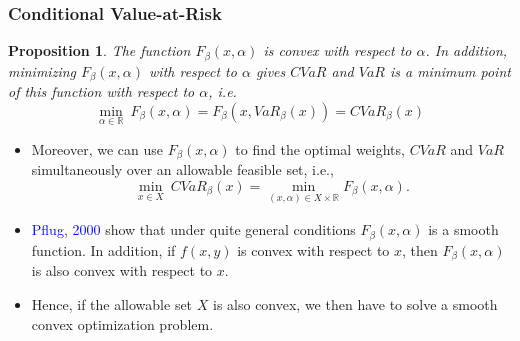 \documentclass[pdf,9pt,xcolor=dvipsnames,hide notes]{beamer}
\newtheorem{proposition}{Proposition}
\begin{document}
\begin{frame}[label=frame2b6]
	\frametitle{Conditional Value-at-Risk}
	
	\begin{proposition}
			The function $F_{\beta }\left( x,\alpha \right) $ is convex with respect to $%
			\alpha $. In addition, minimizing $F_{\beta }\left( x,\alpha \right) $ with
			respect to $\alpha $ gives $CVaR$ and $VaR$ is a minimum point of this
			function with respect to $\alpha $, i.e.
			\begin{equation}
			\underset{\alpha \in
				\mathbb{R}
			}{\min }~F_{\beta }\left( x,\alpha \right) =F_{\beta }\left( x,VaR_{\beta
			}\left( x\right) \right) =CVaR_{\beta }(x)  \label{seven}
			\end{equation}
		\end{proposition}
		
		\vspace{0.3cm}
		
			\begin{itemize}
			\justifying
			
					\item Moreover, we can use $F_{\beta }\left( x,\alpha \right) $ to find the optimal weights, $CVaR$ and
			$VaR$ simultaneously over an allowable feasible set, i.e.,
			\begin{equation}
			\underset{x\in X}{\min }~CVaR_{\beta }(x)=\underset{}{\underset{\left(
					x,\alpha \right) \in X\times
					\mathbb{R}
				}{\min }F_{\beta }\left( x,\alpha \right) }.  \label{eight}
			\end{equation}
			
			\vspace{0.3cm}
			
			\item \textcolor{blue}{Pflug}, \textcolor{blue}{2000} show that under quite general conditions $F_{\beta
			}\left( x,\alpha \right) $ is a smooth function. In addition, if $f(x,y)$ is
			convex with respect to $x$, then $F_{\beta }\left( x,\alpha \right) $ is
			also convex with respect to $x$. 
			
			\vspace{0.3cm}
			
			\item Hence, if the allowable set $X$ is also
			convex, we then have to solve a smooth convex optimization problem.
			
		\end{itemize}
	
\end{frame}
\end{document}
